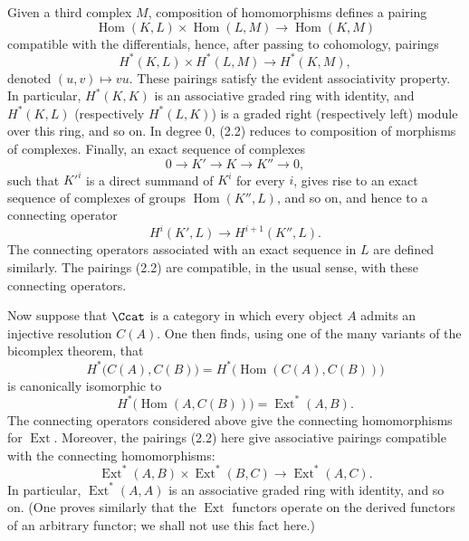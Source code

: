 Given a third complex $M$, composition of homomorphisms defines a pairing
\[
  \operatorname{Hom}(K,L)\times\operatorname{Hom}(L,M)
  \longrightarrow\operatorname{Hom}(K,M)
\]
compatible with the differentials, hence, after passing to cohomology, pairings
\begin{equation}\tag{2.2}
  H^{*}(K,L)\times H^{*}(L,M)\longrightarrow H^{*}(K,M),
\end{equation}
denoted $(u,v)\longmapsto vu$. These pairings satisfy the evident associativity
property. In particular, $H^{*}(K,K)$ is an associative graded ring with
identity, and $H^{*}(K,L)$ (respectively $H^{*}(L,K)$) is a graded right
(respectively left) module over this ring, and so on. In degree $0$, (2.2)
reduces to composition of morphisms of complexes. Finally, an exact sequence of
complexes
\[
  0\longrightarrow K'\longrightarrow K\longrightarrow K''\longrightarrow 0,
\]
such that $K'^{i}$ is a direct summand of $K^{i}$ for every $i$, gives rise to an
exact sequence of complexes of groups $\operatorname{Hom}(K'',L)$, and so on,
and hence to a connecting operator
\[
  H^{i}(K',L)\longrightarrow H^{i+1}(K'',L).
\]
The connecting operators associated with an exact sequence in $L$ are defined
similarly. The pairings (2.2) are compatible, in the usual sense, with these
connecting operators.

Now suppose that $\Ccat$ is a category in which every object $A$ admits an
injective resolution $C(A)$. One then finds, using one of the many variants of
the bicomplex theorem, that
\[
  H^{*}\bigl(C(A),C(B)\bigr)
  =H^{*}\bigl(\operatorname{Hom}(C(A),C(B))\bigr)
\]
is canonically isomorphic to
\[
  H^{*}\bigl(\operatorname{Hom}(A,C(B))\bigr)
  =\operatorname{Ext}^{*}(A,B).
\]
The connecting operators considered above give the connecting homomorphisms for
$\operatorname{Ext}$. Moreover, the pairings (2.2) here give associative
pairings compatible with the connecting homomorphisms:
\begin{equation}\tag{2.3}
  \operatorname{Ext}^{*}(A,B)\times\operatorname{Ext}^{*}(B,C)
  \longrightarrow\operatorname{Ext}^{*}(A,C).
\end{equation}
In particular, $\operatorname{Ext}^{*}(A,A)$ is an associative graded ring with
identity, and so on. (One proves similarly that the $\operatorname{Ext}$
functors operate on the derived functors of an arbitrary functor; we shall not
use this fact here.)

